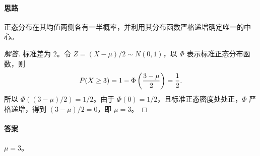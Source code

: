 \paragraph{思路} 正态分布在其均值两侧各有一半概率，并利用其分布函数严格递增确定唯一的中心。
\begin{proof}[解答]
标准差为 $2$。令 $Z=(X-\mu)/2\sim N(0,1)$，以 $\Phi$ 表示标准正态分布函数，则
\[
\P(X\geq3)=1-\Phi\left(\frac{3-\mu}{2}\right)=\frac12.
\]
所以 $\Phi((3-\mu)/2)=1/2$。由于 $\Phi(0)=1/2$，且标准正态密度处处正，$\Phi$ 严格递增，得到 $(3-\mu)/2=0$，即 $\mu=3$。
\end{proof}
\paragraph{答案} $\mu=3$。
